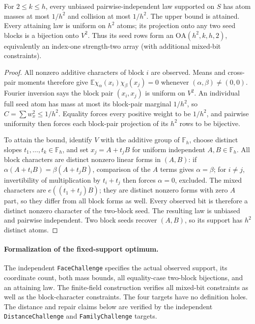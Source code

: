 \begin{theorem}
\label{s25:thm:design-face-optimum}
For $2\le k\le h$, every unbiased pairwise-independent law supported
on $S$ has atom masses at most $1/h^2$ and collision at most $1/h^2$.
The upper bound is attained. Every attaining law is uniform on $h^2$
atoms; its projection onto any two seed blocks is a bijection onto
$V^2$. Thus its seed rows form an $\mathrm{OA}(h^2,k,h,2)$, equivalently
an index-one strength-two array (with additional mixed-bit constraints).
\end{theorem}
\begin{proof}
All nonzero additive characters of block $i$ are observed. Means and
cross-pair moments therefore give
$\mathbb E\chi_\alpha(x_i)\chi_\beta(x_j)=0$ whenever
$(\alpha,\beta)\ne(0,0)$. Fourier inversion says the block pair
$(x_i,x_j)$ is uniform on $V^2$. An individual full seed atom has
mass at most its block-pair marginal $1/h^2$, so
$C=\sum w_x^2\le1/h^2$. Equality forces every positive weight to be
$1/h^2$, and pairwise uniformity then forces each block-pair projection
of its $h^2$ rows to be bijective.

To attain the bound, identify $V$ with the additive group of
$\mathbb F_h$, choose distinct slopes $t_1,\ldots,t_k\in\mathbb F_h$,
and set $x_j=A+t_jB$ for uniform independent $A,B\in\mathbb F_h$.
All block characters are distinct nonzero linear forms in $(A,B)$:
if $\alpha(A+t_iB)=\beta(A+t_jB)$, comparison of the $A$ terms gives
$\alpha=\beta$; for $i\ne j$, invertibility of multiplication by
$t_i+t_j$ then forces $\alpha=0$, excluded. The mixed characters are
$e((t_1+t_j)B)$; they are distinct nonzero forms with zero $A$ part,
so they differ from all block forms as well. Every observed bit is
therefore a distinct nonzero character of the two-block seed. The
resulting law is unbiased and pairwise independent. Two block seeds
recover $(A,B)$, so its support has $h^2$ distinct atoms.
\end{proof}

\paragraph{Formalization of the fixed-support optimum.}
The independent \texttt{FaceChallenge} specifies the actual observed support,
its coordinate count, both mass bounds, all equality-case two-block
bijections, and an attaining law. The finite-field construction verifies
all mixed-bit constraints as well as the block-character constraints.
The four targets have no definition holes. The distance and repair claims below are verified by the independent
\texttt{DistanceChallenge} and \texttt{FamilyChallenge} targets.

